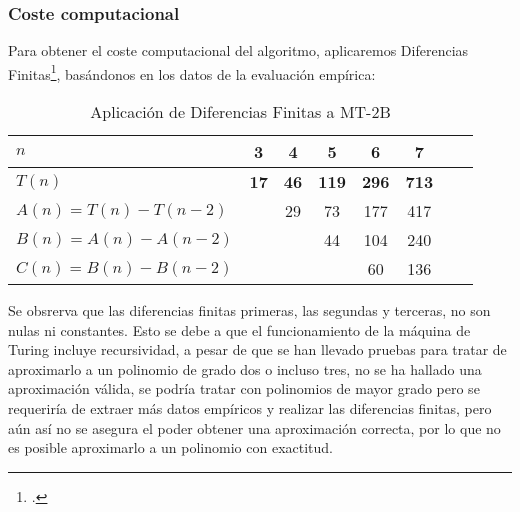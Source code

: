 \subsubsection*{Coste computacional}
Para obtener el coste computacional del algoritmo, aplicaremos Diferencias Finitas\footcite[ver][pgs. 1-42: \textit{Chapter 1. Difference Tables and Polynomial Fits}]{cuoco2005mathematical}, basándonos en los datos de la evaluación empírica:


\begin{table}[h]
    \centering
    \begin{tabular}{|l|c|c|c|c|c|c|c|}
        \hline
        $n$ & \textbf{3} & \textbf{4} & \textbf{5} & \textbf{6} & \textbf{7}\\ \hline
        $T(n)$ & \textbf{17} & \textbf{46} & \textbf{119} & \textbf{296} & \textbf{713}      \\ \hline
        \hline
        $A(n) = T(n) - T(n-2)$ &    & 29 & 73 & 177 & 417 \\ \hline
        $B(n) = A(n) - A(n-2)$ &    &   & 44 & 104 & 240 \\ \hline
        $C(n) = B(n) - B(n-2)$ &    &   &    & 60 & 136 \\ \hline
    \end{tabular}
    \caption{Aplicación de Diferencias Finitas a MT-2B}
\end{table}

Se obsrerva que las diferencias finitas primeras, las segundas y terceras, no son nulas ni constantes. Esto se debe a que el funcionamiento de la máquina de Turing incluye recursividad, a pesar de que se han llevado pruebas para tratar de aproximarlo a un polinomio de grado dos o incluso tres, no se ha hallado una aproximación válida, se podría tratar con polinomios de mayor grado pero se requeriría de extraer más datos empíricos y realizar las diferencias finitas, pero aún así no se asegura el poder obtener una aproximación correcta, por lo que no es posible aproximarlo a un polinomio con exactitud. \medskip
